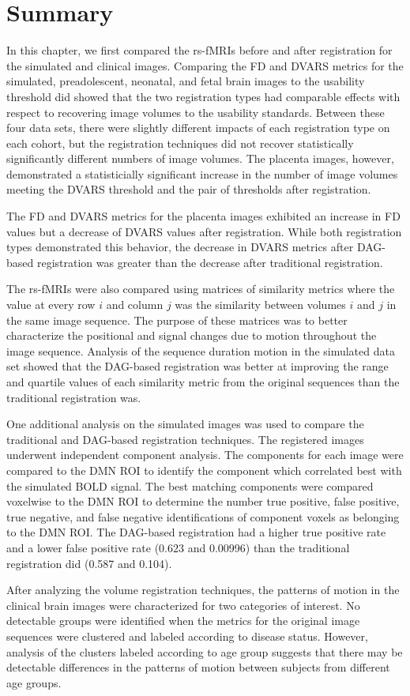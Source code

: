 \section{Summary}

In this chapter, we first compared the rs-fMRIs before and after registration for the simulated and clinical images. Comparing the FD and DVARS metrics for the simulated, preadolescent, neonatal, and fetal brain images to the usability threshold did showed that the two registration types had comparable effects with respect to recovering image volumes to the usability standards. Between these four data sets, there were slightly different impacts of each registration type on each cohort, but the registration techniques did not recover statistically significantly different numbers of image volumes. The placenta images, however, demonstrated a statisticially significant increase in the number of image volumes meeting the DVARS threshold and the pair of thresholds after registration.

The FD and DVARS metrics for the placenta images exhibited an increase in FD values but a decrease of DVARS values after registration. While both registration types demonstrated this behavior, the decrease in DVARS metrics after DAG-based registration was greater than the decrease after traditional registration.

The rs-fMRIs were also compared using matrices of similarity metrics where the value at every row $i$ and column $j$ was the similarity between volumes $i$ and $j$ in the same image sequence. The purpose of these matrices was to better characterize the positional and signal changes due to motion throughout the image sequence. Analysis of the sequence duration motion in the simulated data set showed that the DAG-based registration was better at improving the range and quartile values of each similarity  metric from the original sequences than the traditional registration was.

One additional analysis on the simulated images was used to compare the traditional and DAG-based registration techniques. The registered images underwent independent component analysis. The components for each image were compared to the DMN ROI to identify the component which correlated best with the simulated BOLD signal. The best matching components were compared voxelwise to the DMN ROI to determine the number true positive, false positive, true negative, and false negative identifications of component voxels as belonging to the DMN ROI. The DAG-based registration had a higher true positive rate and a lower false positive rate (0.623 and 0.00996) than the traditional registration did (0.587 and 0.104).

After analyzing the volume registration techniques, the patterns of motion in the clinical brain images were characterized for two categories of interest. No detectable groups were identified when the metrics for the original image sequences were clustered and labeled according to disease status. However, analysis of the clusters labeled according to age group suggests that there may be detectable differences in the patterns of motion between subjects from different age groups.